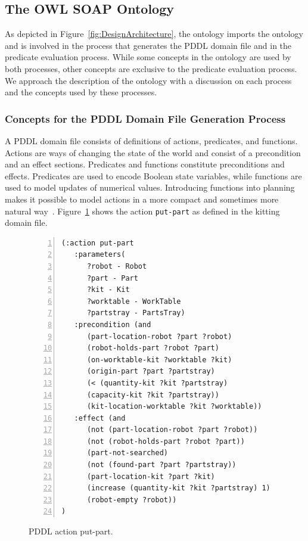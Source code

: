 \subsection{The OWL SOAP Ontology}\label{owlsoap}
As depicted in Figure~\ref{fig:DesignArchitecture}, the  ontology imports the  ontology and is involved in the process that generates the PDDL domain file and in the predicate evaluation process. While some concepts in the  ontology are used by both processes, other concepts are exclusive to the predicate evaluation process. We approach the description of the  ontology with a discussion on each process and the concepts used by these processes.

\subsubsection{Concepts for the PDDL Domain File Generation Process}\label{sss:domainfile}
A PDDL domain file consists of definitions of actions, predicates, and functions. Actions are ways of changing the state of the world and consist of a precondition and an effect sections. Predicates and functions constitute preconditions and effects. Predicates are used to encode Boolean state variables, while functions are used to model updates of numerical values. Introducing functions into planning makes it possible to model actions in a more compact and sometimes more natural way~\cite{FOX.JAIR.2003}. Figure~\ref{fig:put-part} shows the action \texttt{put-part} as defined in the kitting domain file.

\begin{figure}[t!h!]
\begin{minipage}{.5\paperwidth}
\begin{list}{}{\setlength{\leftmargin}{1em}}\item\small
\begin{Verbatim}[commandchars=\\\{\},fontsize=\scriptsize, numbers=left, numbersep=2pt]
(:action put-part
   :parameters(
      ?robot - Robot
      ?part - Part
      ?kit - Kit
      ?worktable - WorkTable
      ?partstray - PartsTray)
   :precondition (and
      (part-location-robot ?part ?robot)
      (robot-holds-part ?robot ?part)
      (on-worktable-kit ?worktable ?kit)
      (origin-part ?part ?partstray)
      (< (quantity-kit ?kit ?partstray)
      (capacity-kit ?kit ?partstray))
      (kit-location-worktable ?kit ?worktable))
   :effect (and
      (not (part-location-robot ?part ?robot))
      (not (robot-holds-part ?robot ?part))
      (part-not-searched)
      (not (found-part ?part ?partstray))
      (part-location-kit ?part ?kit)
      (increase (quantity-kit ?kit ?partstray) 1)
      (robot-empty ?robot))
)
\end{Verbatim}
\end{list}
\end{minipage}
\caption{PDDL action put-part.}
\label{fig:put-part}
\end{figure}

